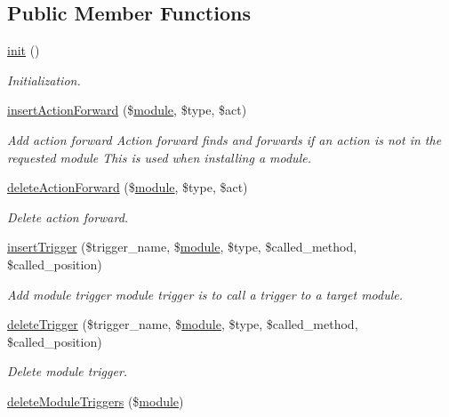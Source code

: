 \subsection*{Public Member Functions}
\begin{DoxyCompactItemize}
\item 
\hyperlink{classmoduleController_a589d3d74f4601ae495a33d001ad8ffa0}{init} ()
\begin{DoxyCompactList}\small\item\em Initialization. \end{DoxyCompactList}\item 
\hyperlink{classmoduleController_a9a5ff2def7412c659594c62a4615a0cd}{insert\-Action\-Forward} (\$\hyperlink{classmodule}{module}, \$type, \$act)
\begin{DoxyCompactList}\small\item\em Add action forward Action forward finds and forwards if an action is not in the requested module This is used when installing a module. \end{DoxyCompactList}\item 
\hyperlink{classmoduleController_ad256622e3b12acb2d96997315dc6fc45}{delete\-Action\-Forward} (\$\hyperlink{classmodule}{module}, \$type, \$act)
\begin{DoxyCompactList}\small\item\em Delete action forward. \end{DoxyCompactList}\item 
\hyperlink{classmoduleController_ad4fb0e3cfddb064ffcc9d71f983066a9}{insert\-Trigger} (\$trigger\-\_\-name, \$\hyperlink{classmodule}{module}, \$type, \$called\-\_\-method, \$called\-\_\-position)
\begin{DoxyCompactList}\small\item\em Add module trigger module trigger is to call a trigger to a target module. \end{DoxyCompactList}\item 
\hyperlink{classmoduleController_a60dbf5d358cddb566b3d3e297a003d23}{delete\-Trigger} (\$trigger\-\_\-name, \$\hyperlink{classmodule}{module}, \$type, \$called\-\_\-method, \$called\-\_\-position)
\begin{DoxyCompactList}\small\item\em Delete module trigger. \end{DoxyCompactList}\item 
\hyperlink{classmoduleController_a48fb7491a1b86e30895ff4be5df7587d}{delete\-Module\-Triggers} (\$\hyperlink{classmodule}{module})

\end{DoxyCompactItemize}
